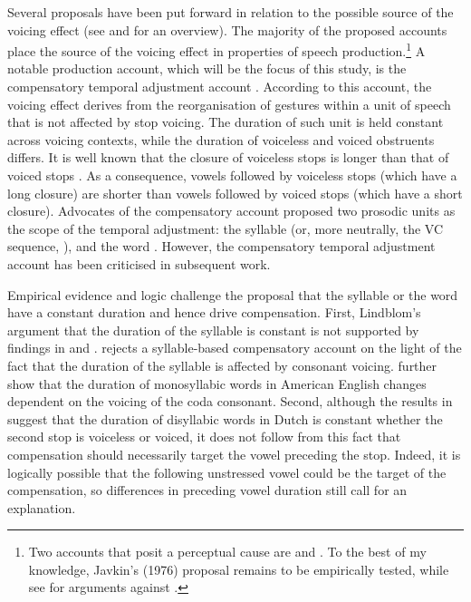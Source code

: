 \documentclass[preprint]{JASAnew}
\begin{document}
Several proposals have been put forward in relation to the possible
source of the voicing effect (see \citealt{soskuthy2013} and
\citealt{begus2017} for an overview). The majority of the proposed
accounts place the source of the voicing effect in properties of speech
production.\footnote{Two accounts that posit a perceptual cause are \citet{javkin1976} and \citet{kluender1988}. To the best of my knowledge, Javkin's (1976) proposal remains to be empirically tested, while see \citet{fowler1992} for arguments against \citet{kluender1988}.}
A notable production account, which will be the focus of this study, is
the compensatory temporal adjustment account
\citep{lindblom1967, slis1969a, slis1969, lehiste1970, lehiste1970a}.
According to this account, the voicing effect derives from the
reorganisation of gestures within a unit of speech that is not affected
by stop voicing. The duration of such unit is held constant across
voicing contexts, while the duration of voiceless and voiced obstruents
differs. It is well known that the closure of voiceless stops is longer
than that of voiced stops
\citep{lisker1957, van-summers1987, davis1989, de-jong1991}. As a
consequence, vowels followed by voiceless stops (which have a long
closure) are shorter than vowels followed by voiced stops (which have a
short closure). Advocates of the compensatory account proposed two
prosodic units as the scope of the temporal adjustment: the syllable
(or, more neutrally, the VC sequence, \citealt{lindblom1967}), and the
word \citep{slis1969a, slis1969, lehiste1970, lehiste1970a}. However,
the compensatory temporal adjustment account has been criticised in
subsequent work.

Empirical evidence and logic challenge the proposal that the syllable or
the word have a constant duration and hence drive compensation. First,
Lindblom's \citeyearpar{lindblom1967} argument that the duration of the
syllable is constant is not supported by findings in \citet{chen1970}
and \citet{jacewicz2009}. \citet{chen1970} rejects a syllable-based
compensatory account on the light of the fact that the duration of the
syllable is affected by consonant voicing. \citet{jacewicz2009} further
show that the duration of monosyllabic words in American English changes
dependent on the voicing of the coda consonant. Second, although the
results in \citet{slis1969} suggest that the duration of disyllabic
words in Dutch is constant whether the second stop is voiceless or
voiced, it does not follow from this fact that compensation should
necessarily target the vowel preceding the stop. Indeed, it is logically
possible that the following unstressed vowel could be the target of the
compensation, so differences in preceding vowel duration still call for
an explanation.
\end{document}
